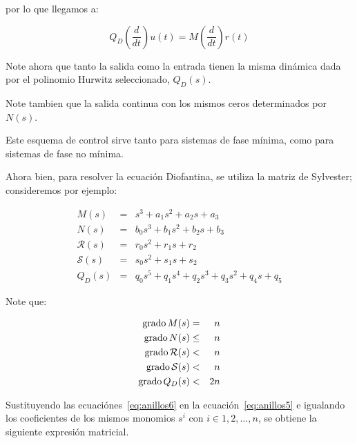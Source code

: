             por lo que llegamos a:

            \begin{equation}
                Q_D \left( \frac{d}{dt} \right) u(t) = M \left( \frac{d}{dt} \right) r(t)
            \end{equation}

            Note ahora que tanto la salida como la entrada tienen la misma dinámica dada por el polinomio Hurwitz seleccionado, $Q_D(s)$.

            Note tambien que la salida continua con los mismos ceros determinados por $N(s)$.

            Este esquema de control sirve tanto para sistemas de fase mínima, como para sistemas de fase no mínima.

            Ahora bien, para resolver la ecuación Diofantina, se utiliza la matriz de Sylvester; consideremos por ejemplo:

            \begin{eqnarray} \label{eq:anillos6}
                M(s) & = & s^3 + a_1 s^2 + a_2 s + a_3 \nonumber \\
                N(s) & = & b_0 s^3 + b_1 s^2 + b_2 s + b_3 \nonumber \\
                \mathcal{R}(s) & = & r_0 s^2 + r_1 s + r_2 \nonumber \\
                \mathcal{S}(s) & = & s_0 s^2 + s_1 s + s_2 \nonumber \\
                Q_D(s) & = & q_0 s^5 + q_1 s^4 + q_2 s^3 + q_3 s^2 + q_4 s + q_5
            \end{eqnarray}

            Note que:

            \begin{eqnarray}
                \operatorname{grado}{M(s)} & = & n \nonumber \\
                \operatorname{grado}{N(s)} & \le & n \nonumber \\
                \operatorname{grado}{\mathcal{R}(s)} & < & n \nonumber \\
                \operatorname{grado}{\mathcal{S}(s)} & < & n \nonumber \\
                \operatorname{grado}{Q_D(s)} & < & 2n
            \end{eqnarray}

            Sustituyendo las ecuaciónes~\ref{eq:anillos6} en la ecuación~\ref{eq:anillos5} e igualando los coeficientes de los mismos monomios $s^i$ con $i \in {1, 2, \dots, n}$, se obtiene la siguiente expresión matricial.

